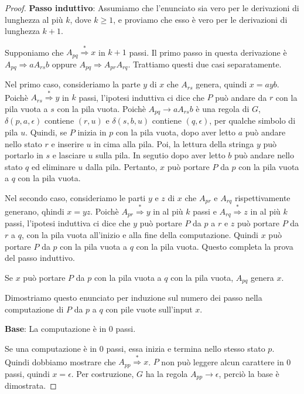 \documentclass[12pt]{report}
\begin{document}
\begin{proof}
	\textbf{Passo induttivo}: Assumiamo che l'enunciato sia vero per le derivazioni di lunghezza al più $k$, dove $k \geq 1$, e proviamo che esso è vero per le derivazioni di lunghezza $k + 1$.

	Supponiamo che $A_{pq} \overset{*}{\Rightarrow} x$ in $k + 1$ passi. Il primo passo in questa derivazione è $A_{pq} \Rightarrow aA_{rs}b$ oppure $A_{pq} \Rightarrow A_{pr}A_{rq}$. Trattiamo questi due casi separatamente.

	Nel primo caso, consideriamo la parte $y$ di $x$ che $A_{rs}$ genera, quindi $x = ayb$. Poichè $A_{rs} \overset{*}{\Rightarrow} y$ in $k$ passi, l'ipotesi induttiva ci dice che $P$ può andare da $r$ con la pila vuota a $s$ con la pila vuota. Poichè $A_{pq} \to aA_{rs}b$ è una regola di $G$, $\delta(p, a, \epsilon)$ contiene $(r, u)$ e $\delta(s, b, u)$ contiene $(q, \epsilon)$, per qualche simbolo di pila $u$. Quindi, se $P$ inizia in $p$ con la pila vuota, dopo aver letto $a$ può andare nello stato $r$ e inserire $u$ in cima alla pila. Poi, la lettura della stringa $y$ può portarlo in $s$ e lasciare $u$ sulla pila. In segutio dopo aver letto $b$ può andare nello stato $q$ ed eliminare $u$ dalla pila. Pertanto, $x$ può portare $P$ da $p$ con la pila vuota  a $q$ con la pila vuota.

	Nel secondo caso, consideriamo le parti $y$ e $z$ di $x$ che  $A_{pr}$ e $A_{rq}$ rispettivamente generano, qhindi $x = yz$. Poichè $A_{pr} \overset{*}{\Rightarrow} y$ in al più $k$ passi e $A_{rq} \overset{*}{\Rightarrow} z$ in al più $k$ passi, l'ipotesi induttiva ci dice che $y$ può portare $P$ da $p$ a $r$ e $z$ può portare $P$ da $r$ a $q$, con la pila vuota all'inizio e alla fine della computazione. Quindi $x$ può portare $P$ da $p$ con la pila vuota a $q$ con la pila vuota. Questo completa la prova del passo induttivo.
	\begin{proposition}{}{}
	Se $x$ può portare $P$ da $p$ con la pila vuota a $q$ con la pila vuota, $A_{pq}$ genera $x$.
	\end{proposition}
	Dimostriamo questo enunciato per induzione sul numero dei passo nella computazione di $P$ da $p$ a $q$ con pile vuote sull'input $x$.

	\textbf{Base}: La computazione è in 0 passi.

	Se una computazione è in 0 passi, essa inizia e termina nello stesso stato $p$. Quindi dobbiamo mostrare che $A_{pp} \overset{*}{\Rightarrow} x$. $P$ non può leggere alcun carattere in 0 passi, quindi $x = \epsilon$. Per costruzione, $G$ ha la regola $A_{pp} \to \epsilon$, perciò la base è dimostrata.


\end{proof}
\end{document}
